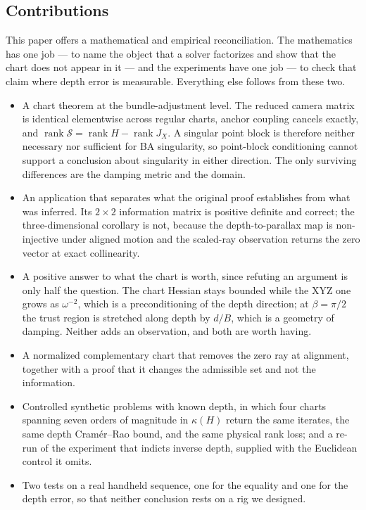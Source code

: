 \documentclass[11pt,a4paper]{article}
\theoremstyle{definition}
\theoremstyle{remark}
\DeclareMathOperator{\rank}{rank}
\begin{document}
\subsection{Contributions}
This paper offers a mathematical and empirical reconciliation. The mathematics has one job --- to name the object that a solver factorizes and show that the chart does not appear in it --- and the experiments have one job --- to check that claim where depth error is measurable. Everything else follows from these two.
\begin{itemize}[leftmargin=2em]
  \item A chart theorem at the bundle-adjustment level. The reduced camera matrix is identical elementwise across regular charts, anchor coupling cancels exactly, and $\rank\mathcal S=\rank H-\rank J_X$. A singular point block is therefore neither necessary nor sufficient for BA singularity, so point-block conditioning cannot support a conclusion about singularity in either direction. The only surviving differences are the damping metric and the domain.
  \item An application that separates what the original proof establishes from what was inferred. Its $2\times2$ information matrix is positive definite and correct; the three-dimensional corollary is not, because the depth-to-parallax map is non-injective under aligned motion and the scaled-ray observation returns the zero vector at exact collinearity.
  \item A positive answer to what the chart is worth, since refuting an argument is only half the question. The chart Hessian stays bounded while the XYZ one grows as $\omega^{-2}$, which is a preconditioning of the depth direction; at $\beta=\pi/2$ the trust region is stretched along depth by $d/B$, which is a geometry of damping. Neither adds an observation, and both are worth having.
  \item A normalized complementary chart that removes the zero ray at alignment, together with a proof that it changes the admissible set and not the information.
  \item Controlled synthetic problems with known depth, in which four charts spanning seven orders of magnitude in $\kappa(H)$ return the same iterates, the same depth Cram\'er--Rao bound, and the same physical rank loss; and a re-run of the experiment that indicts inverse depth, supplied with the Euclidean control it omits.
  \item Two tests on a real handheld sequence, one for the equality and one for the depth error, so that neither conclusion rests on a rig we designed.
\end{itemize}
\end{document}

